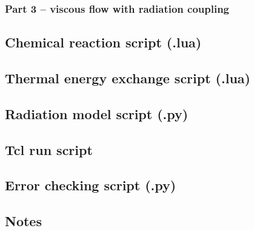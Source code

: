 \topbar

\bottombar

\subsubsection{Part 3 -- viscous flow with radiation coupling}

\topbar

\bottombar

\subsection{Chemical reaction script (.lua)}

\topbar

\bottombar

\subsection{Thermal energy exchange script (.lua)}

\topbar

\bottombar

\subsection{Radiation model script (.py)}

\topbar

\bottombar

\subsection{Tcl run script}
\topbar

\bottombar

\subsection{Error checking script (.py)}
\topbar

\bottombar

\subsection{Notes}
